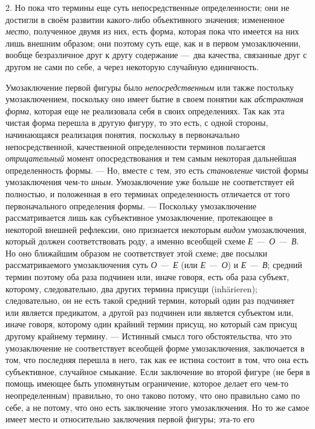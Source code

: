 \documentclass[twoside]{article}
\begin{document}
{{{{{2. Но пока что термины еще суть непосредственные
определенности; они не достигли в своём развитии какого-либо объективного
значения; измененное {\em место},
полученное двумя из них, есть форма, которая пока что имеется
на них лишь внешним образом; они поэтому суть еще, как и в
первом умозаключении, вообще безразличное друг к другу содержание
—~два качества, связанные друг с другом не сами по себе, а
через некоторую случайную единичность.

Умозаключение первой фигуры было
{\em непосредственным}
или также постольку умозаключением, поскольку оно имеет бытие
в своем понятии как {\em абстрактная
форма}, которая еще не реализовала себя в своих
определениях. Так как эта чистая форма перешла в другую фигуру, то это
есть, с одной стороны, начинающаяся реализация понятия, поскольку в
первоначально непосредственной, качественной определенности терминов
полагается {\em отрицательный}
момент опосредствования и тем самым некоторая дальнейшая
определенность формы. — Но, вместе с тем, это есть
{\em становление} чистой
формы умозаключения чем-то {\em иным}.
Умозаключение уже больше не соответствует ей полностью, и
положенная в его терминах определенность отличается от того первоначального
определения формы. — Поскольку умозаключение рассматривается
лишь как субъективное умозаключение, протекающее в некоторой внешней
рефлексии, оно признается некоторым
{\em видом}
умозаключения, который должен соответствовать роду, а именно
всеобщей схеме {\em Е
—~О —~В}. Но оно ближайшим
образом не соответствует этой схеме; две посылки рассматриваемого
умозаключения суть {\em О
—~Е} (или
{\em Е —~О})
и {\em Е
—~В}; средний термин поэтому оба раза подчинен
или, иначе говоря, есть оба раза субъект, которому, следовательно, два
других термина присущи (inhärieren); следовательно, он не
есть такой средний термин, который один раз подчиняет или является
предикатом, а другой раз подчинен или является субъектом или, иначе говоря,
которому один крайний термин присущ, но который сам присущ другому крайнему
термину. — Истинный смысл того обстоятельства, что это
умозаключение не соответствует всеобщей форме умозаключения, заключается в
том, что последняя перешла в него, так как ее истина состоит в том, что она
есть субъективное, случайное смыкание. Если заключение во второй фигуре (не
беря в помощь имеющее быть упомянутым ограничение, которое делает его
чем-то неопределенным) правильно, то оно таково потому, что оно правильно
само по себе, а не потому, что оно есть заключение этого умозаключения. Но
то же самое имеет место и относительно заключения первой фигуры; эта-то его
}}}}}
\end{document}
